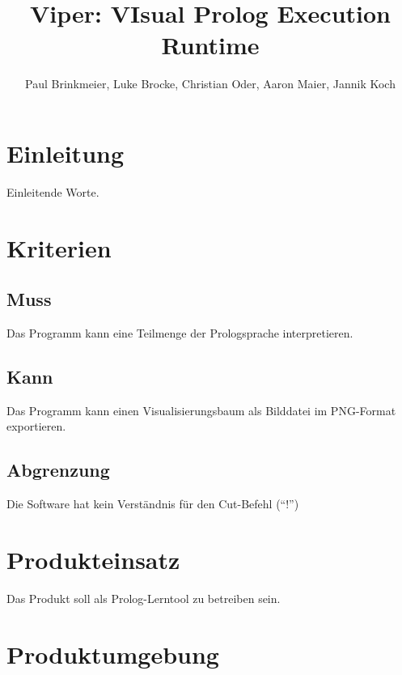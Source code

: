 \documentclass[parskip=full,11pt,twoside]{scrartcl}
\title{Viper: VIsual Prolog Execution Runtime}
\author{Paul Brinkmeier, Luke Brocke, Christian Oder, Aaron Maier, Jannik Koch}
\begin{document}
\maketitle

\section{Einleitung}

Einleitende Worte.

\pagebreak
\section{Kriterien}

\subsection{Muss}


Das Programm kann eine Teilmenge der Prologsprache interpretieren.

\subsection{Kann}


Das Programm kann einen Visualisierungsbaum als Bilddatei im PNG-Format exportieren.

\subsection{Abgrenzung}


Die Software hat kein Verständnis für den Cut-Befehl (\enquote{!})

\pagebreak
\section{Produkteinsatz}

Das Produkt soll als Prolog-Lerntool zu betreiben sein.

\section{Produktumgebung}
\end{document}
